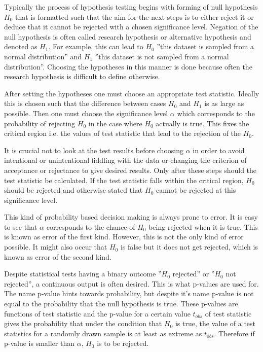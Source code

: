 \documentclass[english, oneside]{HYgradu}
\begin{document}
Typically the process of hypothesis testing begins with forming of null hypothesis $H_0$ that is formatted such that the aim for the next steps is to either reject it or deduce that it cannot be rejected with a chosen significance level. Negation of the null hypothesis is often called research hypothesis or alternative hypothesis and denoted as $H_1$. For example, this can lead to $H_0$ ''this dataset is sampled from a normal distribution'' and $H_1$ ''this dataset is not sampled from a normal distribution''. Choosing the hypotheses in this manner is done because often the research hypothesis is difficult to define otherwise. \citep{bohm2010introduction, wall2003practical}

After setting the hypotheses one must choose an appropriate test statistic. Ideally this is chosen such that the difference between cases $H_0$ and $H_1$ is as large as possible. Then one must choose 
the significance level $\alpha$ which corresponds to the probability of rejecting $H_0$ in the case where $H_0$ actually is true. This fixes the critical region i.e. the values of test statistic that lead to the rejection of the $H_0$. \citep{bohm2010introduction, wall2003practical}

It is crucial not to look at the test results before choosing $\alpha$ in order to avoid intentional or unintentional fiddling with the data or changing the criterion of acceptance or rejectance to give desired results. Only after these steps should the test statistic be calculated. If the test statistic falls within the critical region, $H_0$ should be rejected and otherwise stated that $H_0$ cannot be rejected at this significance level. \citep{bohm2010introduction, wall2003practical}

This kind of probability based decision making is always prone to error. It is easy to see that $\alpha$ corresponds to the chance of $H_0$ being rejected when it is true. This is known as error of the first kind. However, this is not the only kind of error possible. It might also occur that $H_0$ is false but it does not get rejected, which is known as error of the second kind. \citep{bohm2010introduction}

Despite statistical tests having a binary outcome ''$H_0$ rejected'' or ''$H_0$ not rejected'', a continuous output is often desired. This is what p-values are used for. The name p-value hints towards probability, but despite it's name p-value is not equal to the probability that the null hypothesis is true. These p-values are functions of test statistic and the p-value for a certain value $t_{obs}$ of test statistic gives the probability that under the condition that $H_0$ is true, the value of a test statistics for a randomly drawn sample is at least as extreme as $t_{obs}$. Therefore if p-value is smaller than $\alpha$, $H_0$ is to be rejected. \citep{bohm2010introduction}
\end{document}
